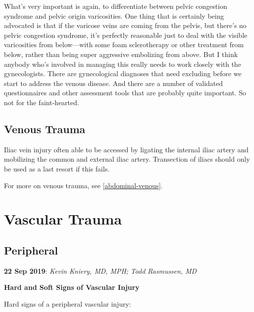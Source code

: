 \documentclass[
]{book}
\begin{document}
What's very important is again, to differentiate between pelvic
congestion syndrome and pelvic origin varicosities. One thing that is
certainly being advocated is that if the varicose veins are coming from
the pelvis, but there's no pelvic congestion syndrome, it's perfectly
reasonable just to deal with the visible varicosities from below---with
some foam sclerotherapy or other treatment from below, rather than being
super aggressive embolizing from above. But I think anybody who's
involved in managing this really needs to work closely with the
gynecologists. There are gynecological diagnoses that need excluding
before we start to address the venous disease. And there are a number of
validated questionnaires and other assessment tools that are probably
quite important. So not for the faint-hearted.

\hypertarget{venous-trauma}{%
\section{Venous Trauma}\label{venous-trauma}}

Iliac vein injury often able to be accessed by ligating the internal
iliac artery and mobilizing the common and external iliac artery.
Transection of iliacs should only be used as a last resort if this
fails. \citep{leeIliacVesselInjuries2002}

For more on venous trauma, see \ref{abdominal-venous}.

\hypertarget{vascular-trauma}{%
\chapter{Vascular Trauma}\label{vascular-trauma}}

\hypertarget{peripheral}{%
\section{Peripheral}\label{peripheral}}

\textbf{22 Sep 2019}: \emph{Kevin Kniery, MD, MPH; Todd Rasmussen, MD}

\textbf{Hard and Soft Signs of Vascular Injury}

Hard signs of a peripheral vascular injury:
\end{document}
